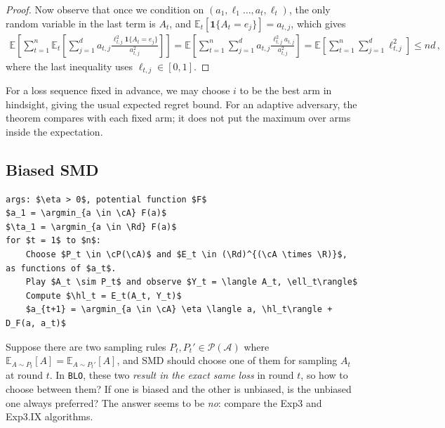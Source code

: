 \documentclass{article}
\theoremstyle{plain}
\theoremstyle{definition}
\newcommand{\R}{\mathbb R}
\newcommand{\Rd}{\mathbb{R}^d}
\newcommand{\argmin}{\operatornamewithlimits{arg\,min}}
\newcommand{\E}{\mathbb E}
\newcommand{\cA}{\mathcal A}
\newcommand{\cP}{\mathcal P}
\newcommand{\ta}{\tilde{a}}
\newcommand{\smdalg}{\textsf{SMD}\xspace}
\newcommand{\expthree}{\textsf{Exp3}\xspace}
\newcommand{\expthreeix}{\textsf{Exp3.IX}\xspace}
\newcommand{\blo}{\texttt{BLO}\xspace}
\newcommand{\hl}{\hat{\ell}\xspace}
\begin{document}
\begin{proof}
    Now observe that once we condition on $(a_1, \ell_1 \ldots, a_{t}, \ell_{t})$, the only random variable in the last term is $A_t$, and $\E_t[\mathbf{1}\{A_t=e_j\}] = a_{t,j}$,
    which gives
    \begin{align*}
        \E\left[
            \sum_{t=1}^{n}
            \E_t\left[
                \sum_{j=1}^{d}
                a_{t,j}
                \frac{
                    \ell_{t,j}^2 \mathbf{1}\{A_t=e_j\}
                }{a_{t,j}^2}
                \right]
            \right]
        =
        \E\left[
            \sum_{t=1}^{n}
            \sum_{j=1}^{d}
            a_{t,j}
            \frac{
                \ell_{t,j}^2 a_{t,j}
            }{a_{t,j}^2}
            \right]
        =
        \E\left[
            \sum_{t=1}^{n}
            \sum_{j=1}^{d}
            \ell_{t,j}^2
            \right]
        \leq nd\,,
    \end{align*}
    where the last inequality uses $\ell_{t,j} \in [0,1]$.
\end{proof}
For a loss sequence fixed in advance, we may choose $i$ to be the best arm
in hindsight, giving the usual expected regret bound.
For an adaptive adversary, the theorem compares with each fixed arm;
it does not put the maximum over arms inside the expectation.

\subsection{Biased \smdalg}
\begin{algorithm}[h!]
    \begin{minipage}{13cm}
        \begin{mdframed}
            \begin{lstlisting}
args: $\eta > 0$, potential function $F$
$a_1 = \argmin_{a \in \cA} F(a)$
$\ta_1 = \argmin_{a \in \Rd} F(a)$
for $t = 1$ to $n$:
    Choose $P_t \in \cP(\cA)$ and $E_t \in (\Rd)^{(\cA \times \R)}$, as functions of $a_t$.
    Play $A_t \sim P_t$ and observe $Y_t = \langle A_t, \ell_t\rangle$
    Compute $\hl_t = E_t(A_t, Y_t)$
    $a_{t+1} = \argmin_{a \in \cA} \eta \langle a, \hl_t\rangle + D_F(a, a_t)$
\end{lstlisting}
            \caption{Biased \smdalg}\label{alg:biased-SMD}
        \end{mdframed}
    \end{minipage}
\end{algorithm}

Suppose there are two sampling rules $P_t, P_t' \in \cP(\cA)$ where
$\E_{A \sim P_t}[A] = \E_{A \sim P_t'}[A]$, and \smdalg should choose
one of them for sampling $A_t$ at round $t$.
In \blo, these two \textit{result in the exact same loss} in round $t$,
so how to choose between them?
If one is biased and the other is unbiased,
is the unbiased one always preferred?
The answer seems to be \textit{no}: compare the \expthree and \expthreeix algorithms.
\end{document}
